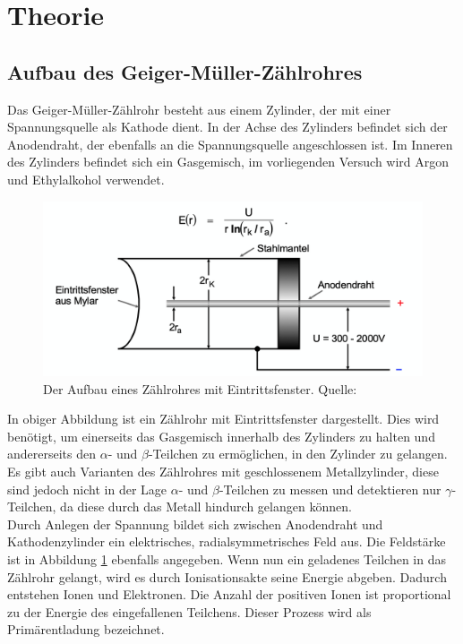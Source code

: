 \section{Theorie}
  \subsection{Aufbau des Geiger-Müller-Zählrohres}
    Das Geiger-Müller-Zählrohr besteht aus einem Zylinder, der mit einer Spannungsquelle als
    Kathode dient. In der Achse des Zylinders befindet sich der Anodendraht, der ebenfalls an die
    Spannungsquelle angeschlossen ist. Im Inneren des Zylinders befindet sich ein Gasgemisch,
    im vorliegenden Versuch wird Argon und Ethylalkohol verwendet.
    \begin{figure}[H]
      \centering
        \includegraphics[scale=0.4]{content/AufbauGMZ.png}
        \caption{Der Aufbau eines Zählrohres mit Eintrittsfenster. Quelle:\cite{AP01}}
        \label{fig:aufbau1}
    \end{figure}
    \noindent
    In obiger Abbildung ist ein Zählrohr mit Eintrittsfenster dargestellt. Dies wird benötigt,
    um einerseits das Gasgemisch innerhalb des Zylinders zu halten und andererseits den
    $\alpha$- und $\beta$-Teilchen zu ermöglichen, in den Zylinder zu gelangen. Es gibt auch
    Varianten des Zählrohres mit geschlossenem Metallzylinder, diese sind jedoch nicht in der Lage
    $\alpha$- und $\beta$-Teilchen zu messen und detektieren nur $\gamma$-Teilchen, da diese durch das
    Metall hindurch gelangen können.\\
    Durch Anlegen der Spannung bildet sich zwischen Anodendraht und Kathodenzylinder ein elektrisches,
    radialsymmetrisches Feld aus. Die Feldstärke ist in Abbildung \ref{fig:aufbau1} ebenfalls
    angegeben. Wenn nun ein geladenes Teilchen in das Zählrohr gelangt, wird es durch Ionisationsakte
    seine Energie abgeben. Dadurch entstehen Ionen und Elektronen. Die Anzahl der positiven Ionen ist
    proportional zu der Energie des eingefallenen Teilchens. Dieser Prozess wird als Primärentladung
    bezeichnet.
